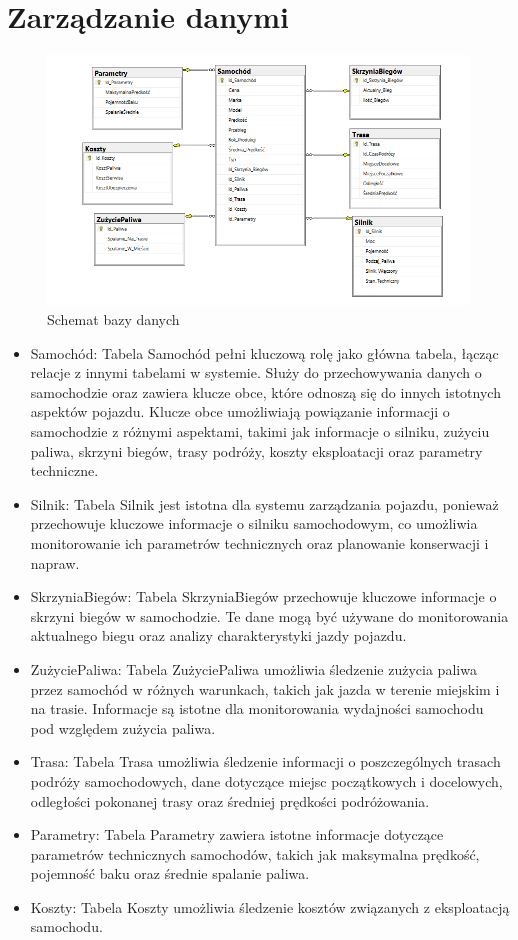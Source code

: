 \section{Zarządzanie danymi }
\begin{figure}[!ht]
	\centering
		\includegraphics[width=14cm]{bazy danych.png}
	\caption{\footnotesize Schemat bazy danych}
	\label{fig:plotend}
\end{figure}
\begin{itemize}
    \item Samochód: Tabela Samochód pełni kluczową rolę jako główna tabela, łącząc relacje z innymi tabelami w systemie. Służy do przechowywania danych o samochodzie oraz zawiera klucze obce, które odnoszą się do innych istotnych aspektów pojazdu. Klucze obce umożliwiają powiązanie informacji o samochodzie z różnymi aspektami, takimi jak informacje o silniku, zużyciu paliwa, skrzyni biegów, trasy podróży, koszty eksploatacji oraz parametry techniczne. 
    \item Silnik: Tabela Silnik jest istotna dla systemu zarządzania pojazdu, ponieważ przechowuje kluczowe informacje o silniku samochodowym, co umożliwia monitorowanie ich parametrów technicznych oraz planowanie konserwacji i napraw.
    \item SkrzyniaBiegów: Tabela SkrzyniaBiegów przechowuje kluczowe informacje o skrzyni biegów w samochodzie. Te dane mogą być używane do monitorowania aktualnego biegu oraz analizy charakterystyki jazdy pojazdu.
    \item ZużyciePaliwa: Tabela ZużyciePaliwa umożliwia śledzenie zużycia paliwa przez samochód w różnych warunkach, takich jak jazda w terenie miejskim i na trasie. Informacje są istotne dla monitorowania wydajności samochodu pod względem zużycia paliwa.
    \item Trasa: Tabela Trasa umożliwia śledzenie informacji o poszczególnych trasach podróży samochodowych, dane dotyczące miejsc początkowych i docelowych, odległości pokonanej trasy oraz średniej prędkości podróżowania.
    \item Parametry: Tabela Parametry zawiera istotne informacje dotyczące parametrów technicznych samochodów, takich jak maksymalna prędkość, pojemność baku oraz średnie spalanie paliwa. 
    \item Koszty: Tabela Koszty umożliwia śledzenie kosztów związanych z eksploatacją samochodu.
\end{itemize}
